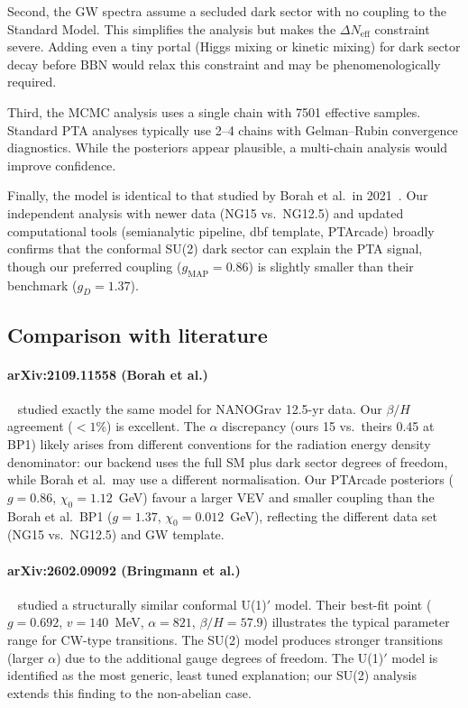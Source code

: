 \documentclass[12pt,a4paper]{article}
\begin{document}
Second, the GW spectra assume a secluded dark sector with no coupling to the Standard Model. This simplifies the analysis but makes the $\Delta N_{\text{eff}}$ constraint severe. Adding even a tiny portal (Higgs mixing or kinetic mixing) for dark sector decay before BBN would relax this constraint and may be phenomenologically required.

Third, the MCMC analysis uses a single chain with 7501 effective samples. Standard PTA analyses typically use 2--4 chains with Gelman--Rubin convergence diagnostics. While the posteriors appear plausible, a multi-chain analysis would improve confidence.

Finally, the model is identical to that studied by Borah et al.\ in 2021~\cite{Borah:2021}. Our independent analysis with newer data (NG15 vs.\ NG12.5) and updated computational tools (semianalytic pipeline, dbf template, PTArcade) broadly confirms that the conformal SU(2) dark sector can explain the PTA signal, though our preferred coupling ($g_{\text{MAP}} = 0.86$) is slightly smaller than their benchmark ($g_D = 1.37$).

\subsection{Comparison with literature}

\paragraph{arXiv:2109.11558 (Borah et al.)}~\cite{Borah:2021} studied exactly the same model for NANOGrav 12.5-yr data. Our $\beta/H$ agreement ($<1\%$) is excellent. The $\alpha$ discrepancy (ours 15 vs.\ theirs 0.45 at BP1) likely arises from different conventions for the radiation energy density denominator: our backend uses the full SM plus dark sector degrees of freedom, while Borah et al.\ may use a different normalisation. Our PTArcade posteriors ($g=0.86$, $\chi_0=1.12$~GeV) favour a larger VEV and smaller coupling than the Borah et al.\ BP1 ($g=1.37$, $\chi_0=0.012$~GeV), reflecting the different data set (NG15 vs.\ NG12.5) and GW template.

\paragraph{arXiv:2602.09092 (Bringmann et al.)}~\cite{Bringmann:2026} studied a structurally similar conformal U(1)$'$ model. Their best-fit point ($g=0.692$, $v=140$~MeV, $\alpha=821$, $\beta/H=57.9$) illustrates the typical parameter range for CW-type transitions. The SU(2) model produces stronger transitions (larger $\alpha$) due to the additional gauge degrees of freedom. The U(1)$'$ model is identified as the most generic, least tuned explanation; our SU(2) analysis extends this finding to the non-abelian case.
\end{document}
